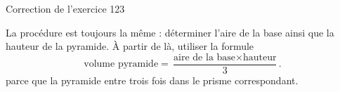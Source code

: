 

\begin{center}
    Correction de l'exercice 123
\end{center}

La procédure est toujours la même : déterminer l'aire de la base ainsi que la hauteur de la pyramide. À partir de là, utiliser la formule
\begin{equation}
    \text{volume pyramide}=\frac{ \text{aire de la base}\times \text{hauteur} }{ 3 }.
\end{equation}
parce que la pyramide entre trois fois dans le prisme correspondant.
